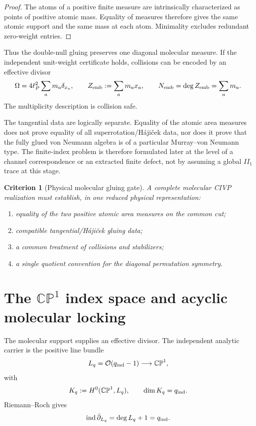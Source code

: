 \documentclass[aps,prd,preprint,nofootinbib,superscriptaddress]{revtex4-2}
\newtheorem{criterion}[theorem]{Criterion}
\theoremstyle{definition}
\theoremstyle{remark}
\newcommand{\cO}{\mathcal O}
\newcommand{\ind}{\operatorname{ind}}
\newcommand{\CP}{\mathbb{CP}}
\begin{document}
\begin{proof}
The atoms of a positive finite measure are intrinsically characterized as points of positive atomic mass.  Equality of measures therefore gives the same atomic support and the same mass at each atom.  Minimality excludes redundant zero-weight entries.
\end{proof}

Thus the double-null gluing preserves one diagonal molecular measure.  If the independent unit-weight certificate holds, collisions can be encoded by an effective divisor
\begin{equation}
\Omega
=
4\ell_P^2
\sum_a m_a\delta_{x_a},
\qquad
Z_{\rm emb}:=\sum_a m_a x_a,
\qquad
N_{\rm emb}=\deg Z_{\rm emb}=\sum_a m_a.
\label{eq:effectivedivisor}
\end{equation}
The multiplicity description is collision safe.

The tangential data are logically separate.  Equality of the atomic area measures does not prove equality of all superrotation/H\'aji\v{c}ek data, nor does it prove that the fully glued von Neumann algebra is of a particular Murray--von Neumann type.  The finite-index problem is therefore formulated later at the level of a channel correspondence or an extracted finite defect, not by assuming a global $II_1$ trace at this stage.

\begin{criterion}[Physical molecular gluing gate]
\label{crit:moleculargluing}
A complete molecular CIVP realization must establish, in one reduced physical representation:
\begin{enumerate}[label=(\roman*)]
\item equality of the two positive atomic area measures on the common cut;
\item compatible tangential/H\'aji\v{c}ek gluing data;
\item a common treatment of collisions and stabilizers;
\item a single quotient convention for the diagonal permutation symmetry.
\end{enumerate}
\end{criterion}


\section{The $\mathbb{CP}^1$ index space and acyclic molecular locking}
\label{sec:cp1}

The molecular support supplies an effective divisor.  The independent analytic carrier is the positive line bundle
\begin{equation}
L_q=\cO(q_{\rm ind}-1)
\longrightarrow
\CP^1,
\label{eq:Lq}
\end{equation}
with
\begin{equation}
K_q:=H^0(\CP^1,L_q),
\qquad
\dim K_q=q_{\rm ind}.
\label{eq:Kq}
\end{equation}
Riemann--Roch gives
\begin{equation}
\ind\bar\partial_{L_q}
=
\deg L_q+1
=
q_{\rm ind}.
\label{eq:RRbasic}
\end{equation}
\end{document}
